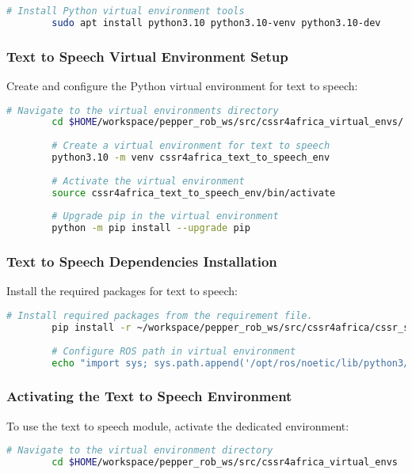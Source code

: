 \documentclass{CSSRforAfrica}
\begin{document}
{\begin{lstlisting}[style=withoutNumbering, language=bash]
		# Install Python virtual environment tools
		sudo apt install python3.10 python3.10-venv python3.10-dev
		\end{lstlisting}
		
		\subsubsection*{Text to Speech Virtual Environment Setup}
		Create and configure the Python virtual environment for text to speech:
		\begin{lstlisting}[style=withoutNumbering, language=bash]
		# Navigate to the virtual environments directory
		cd $HOME/workspace/pepper_rob_ws/src/cssr4africa_virtual_envs/
		
		# Create a virtual environment for text to speech
		python3.10 -m venv cssr4africa_text_to_speech_env
		
		# Activate the virtual environment
		source cssr4africa_text_to_speech_env/bin/activate
		
		# Upgrade pip in the virtual environment
		python -m pip install --upgrade pip
		\end{lstlisting}
		
		\subsubsection*{Text to Speech Dependencies Installation}
		Install the required packages for text to speech:
		\begin{lstlisting}[style=withoutNumbering, language=bash]
		# Install required packages from the requirement file.
		pip install -r ~/workspace/pepper_rob_ws/src/cssr4africa/cssr_system/text_to_speech/text_to_speech_requirements.txt
		
		# Configure ROS path in virtual environment
		echo "import sys; sys.path.append('/opt/ros/noetic/lib/python3/dist-packages')" > $(python -c "import site; print(site.getsitepackages()[0])")/sitecustomize.py
		\end{lstlisting}
		
		\subsubsection*{Activating the Text to Speech Environment}
		To use the text to speech module, activate the dedicated environment:
		\begin{lstlisting}[style=withoutNumbering, language=bash]
		# Navigate to the virtual environment directory
		cd $HOME/workspace/pepper_rob_ws/src/cssr4africa_virtual_envs
		

\end{lstlisting}}
\end{document}
